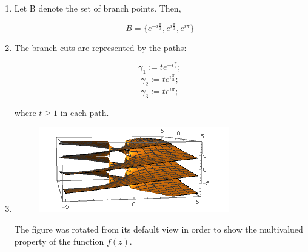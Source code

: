 \documentclass{article}
\begin{document}
\begin{enumerate}
\begin{enumerate}
			\item Let B denote the set of branch points. Then,
			
			\[ B = \{ e^{-i\frac{\pi}{3}}, e^{i\frac{\pi}{3}},e^{i\pi} \} \]
		
		\item The branch cuts are represented by the paths:
		
		\[\gamma_1:= te^{-i\frac{\pi}{3}}; \]
		\[\gamma_2:= te^{i\frac{\pi}{3}}; \]
		\[\gamma_3:= te^{i\pi}; \]
		
		where $t \geq 1$ in each path.
		
		\item {}
		\begin{figure}[H]
		\includegraphics[scale=0.8]{image5.png}
		\end{figure}
		The figure was rotated from its default view in order to show the multivalued property of the function $f(z)$.
		\end{enumerate}
\end{enumerate}

\end{document}
